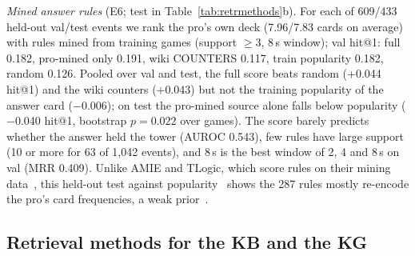 \emph{Mined answer rules} (E6; test in Table~\ref{tab:retrmethods}b). For each of 609/433 held-out val/test events we rank the pro's own deck (7.96/7.83 cards on average) with rules mined from training games (support $\ge3$, 8\,s window); val hit@1: full 0.182, pro-mined only 0.191, wiki COUNTERS 0.117, train popularity 0.182, random 0.126. Pooled over val and test, the full score beats random (+0.044 hit@1) and the wiki counters (+0.043) but not the training popularity of the answer card ($-$0.006); on test the pro-mined source alone falls below popularity ($-$0.040 hit@1, bootstrap $p=0.022$ over games). The score barely predicts whether the answer held the tower (AUROC 0.543), few rules have large support (10 or more for 63 of 1,042 events), and 8\,s is the best window of 2, 4 and 8\,s on val (MRR 0.409). Unlike AMIE and TLogic, which score rules on their mining data~\cite{lajus2020amie3,liu2022tlogic}, this held-out test against popularity~\cite{ruffinelli2020olddog} shows the 287 rules mostly re-encode the pro's card frequencies, a weak prior~\cite{cap6938L07}. %

\subsection{Retrieval methods for the KB and the KG}
\label{sec:retrmethods}

